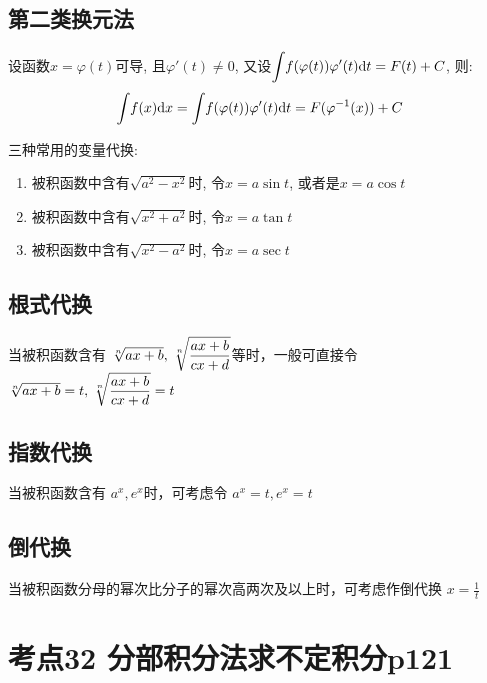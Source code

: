 \subsection{第二类换元法}
设函数$ x=\varphi(t) $可导, 且$ \varphi'(t)\neq 0 $, 又设$ \displaystyle\int_{}\hspace{.2em}f(\varphi(t))\varphi'(t)\mathrm{d}t=F(t)+C $, 则:
\begin{equation*}
\displaystyle\int_{}\hspace{.2em}f(x)\mathrm{d}x=\displaystyle\int_{}\hspace{.2em}f(\varphi(t))\varphi'(t)\mathrm{d}t=F(\varphi^{-1}(x))+C
\end{equation*}
\begin{tcolorbox}
三种常用的变量代换:
\begin{enumerate}
\item 被积函数中含有$ \sqrt{a^{2}-x^{2}} $时, 令$ x=a\sin t $, 或者是$ x=a\cos t $
\item 被积函数中含有$ \sqrt{x^{2}+a^{2}} $时, 令$ x=a\tan t $
\item 被积函数中含有$ \sqrt{x^{2}-a^{2}} $时, 令$ x=a\sec t $
\end{enumerate}
\end{tcolorbox}

\subsection{根式代换}

当被积函数含有 $\sqrt[n]{ax+b},\displaystyle\hspace{.2em}\sqrt[n]{\frac{ax+b}{cx+d}}$等时，一般可直接令 $\sqrt[n]{ax+b}=t,\displaystyle\hspace{.2em}\sqrt[n]{\frac{ax+b}{cx+d}}=t$

\subsection{指数代换}

当被积函数含有 $a^x,e^x$时，可考虑令 $a^x=t,e^x=t$

\subsection{倒代换}

当被积函数分母的幂次比分子的幂次高两次及以上时，可考虑作倒代换 $x=\frac{1}{t}$

\section{考点32 分部积分法求不定积分p121}

